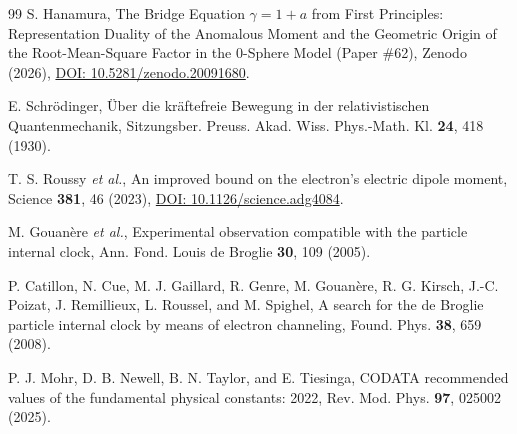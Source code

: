 \documentclass[%
 reprint, amsmath,amssymb, aps, prb, ]{revtex4-2}
\numberwithin{equation}{section}
\begin{document}
\begin{thebibliography}{99}
 S. Hanamura, The Bridge Equation $\gamma = 1 + a$ from First Principles: Representation Duality of the Anomalous Moment and the Geometric Origin of the Root-Mean-Square Factor in the 0-Sphere Model (Paper \#62), Zenodo (2026), \href{https://doi.org/10.5281/zenodo.20091680}{DOI: 10.5281/zenodo.20091680}.

 E. Schr\"odinger, \"Uber die kr\"aftefreie Bewegung in der relativistischen Quantenmechanik, Sitzungsber. Preuss. Akad. Wiss. Phys.-Math. Kl. \textbf{24}, 418 (1930).

 T. S. Roussy \textit{et al.}, An improved bound on the electron's electric dipole moment, Science \textbf{381}, 46 (2023), \href{https://doi.org/10.1126/science.adg4084}{DOI: 10.1126/science.adg4084}.

 M. Gouan\`ere \textit{et al.}, Experimental observation compatible with the particle internal clock, Ann. Fond. Louis de Broglie \textbf{30}, 109 (2005).

 P. Catillon, N. Cue, M. J. Gaillard, R. Genre, M. Gouan\`ere, R. G. Kirsch, J.-C. Poizat, J. Remillieux, L. Roussel, and M. Spighel, A search for the de Broglie particle internal clock by means of electron channeling, Found. Phys. \textbf{38}, 659 (2008).

 P. J. Mohr, D. B. Newell, B. N. Taylor, and E. Tiesinga, CODATA recommended values of the fundamental physical constants: 2022, Rev. Mod. Phys. \textbf{97}, 025002 (2025).

\end{thebibliography}

\end{document}
